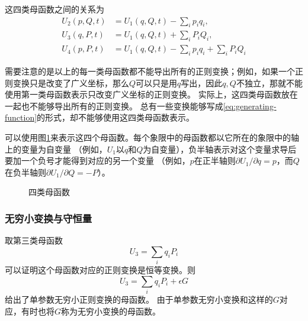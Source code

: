\documentclass[UTF8, a4paper]{ctexart}
\begin{document}
这四类母函数之间的关系为
\begin{equation}
    \begin{aligned}
        U_2(p, Q, t) &= U_1(q, Q, t) - \sum_i p_i q_i, \\
        U_3(q, P, t) &= U_1(q, Q, t) + \sum_i P_i Q_i, \\
        U_4(p, P, t) &= U_1(q, Q, t) - \sum_i p_i q_i + \sum_i P_i Q_i
    \end{aligned}
\end{equation}

需要注意的是以上的每一类母函数都不能导出所有的正则变换；例如，如果一个正则变换只是改变了广义坐标，那么$Q$可以只是用$q$写出，因此$q, Q$不独立，那就不能使用第一类母函数表示只改变广义坐标的正则变换。
实际上，这四类母函数放在一起也不能够导出所有的正则变换。
总有一些变换能够写成\eqref{eq:generating-function}的形式，却不能够使用这四类母函数表示。

可以使用图\ref{fig:generating-functions}来表示这四个母函数。每个象限中的母函数都以它所在的象限中的轴上的变量为自变量
（例如，$U_1$以$q$和$Q$为自变量），负半轴表示对这个变量求导后要加一个负号才能得到对应的另一个变量
（例如，$p$在正半轴则$\partial U_1 / \partial q = p$，而$Q$在负半轴则$\partial U_1 / \partial Q = - P$）。
\begin{figure}
    \centering
    \caption{四类母函数}
    \label{fig:generating-functions}
\end{figure}

\subsubsection{无穷小变换与守恒量}

取第三类母函数
\[
    U_3 = \sum_i q_i P_i
\]
可以证明这个母函数对应的正则变换是恒等变换。则
\begin{equation}
    U_3 = \sum_i q_i P_i + \epsilon G
\end{equation}
给出了单参数无穷小正则变换的母函数。
由于单参数无穷小变换和这样的$G$对应，有时也将$G$称为无穷小变换的母函数。
\end{document}
